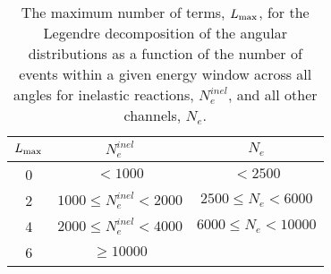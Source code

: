 \documentclass[
10pt,
showpacs,preprintnumbers,footinbib,
amsfonts,amsmath,amssymb,
aps,
prc,twocolumn,groupedaddress,superscriptaddress,
showkeys,
nofootinbib
]{revtex4-1}
\begin{document}
\begin{table}
\caption{The maximum number of terms, $L_{\rm max}$, for the Legendre decomposition of the angular distributions as a function of the number of events within a given energy window across all angles for inelastic reactions, $N_e^{inel}$, and all other channels, $N_e$.}
\begin{center}
\begin{tabular}{| c | c | c |}
\hline
$L_{\rm max}$ & $N_e^{inel}$ & $N_e$ \\
\hline
0 & $< 1000$ & $< 2500$\\
2 & $1000 \le N_e^{inel} < 2000$ & $2500 \le N_e < 6000$\\
4 & $2000 \le N_e^{inel} < 4000$ & $6000 \le N_e < 10000$\\
6 & $\ge 10000$\\
\hline
\end{tabular}
\label{tab:L_max}
\end{center}
\end{table}
\end{document}
